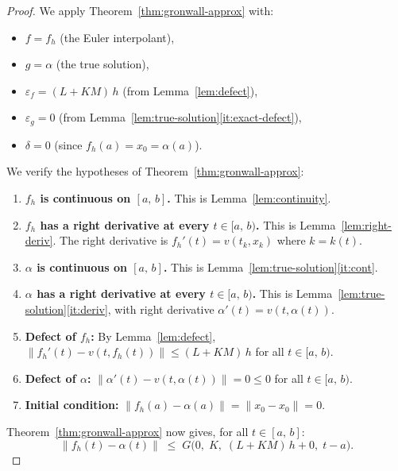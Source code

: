 \documentclass[11pt,a4paper]{article}
\theoremstyle{definition}
\newcommand{\norm}[1]{\lVert #1 \rVert}
\newcommand{\Icc}[2]{[#1,\, #2]}
\newcommand{\Ico}[2]{[#1,\, #2)}
\begin{document}
\begin{proof}
We apply Theorem~\ref{thm:gronwall-approx} with:
\begin{itemize}
  \item $f = f_h$ (the Euler interpolant),
  \item $g = \alpha$ (the true solution),
  \item $\varepsilon_f = (L + KM)\,h$ (from Lemma~\ref{lem:defect}),
  \item $\varepsilon_g = 0$ (from Lemma~\ref{lem:true-solution}\ref{it:exact-defect}),
  \item $\delta = 0$ (since $f_h(a) = x_0 = \alpha(a)$).
\end{itemize}

We verify the hypotheses of Theorem~\ref{thm:gronwall-approx}:
\begin{enumerate}[label=(\alph*)]
  \item \textbf{$f_h$ is continuous on $\Icc{a}{b}$.}
    This is Lemma~\ref{lem:continuity}.

  \item \textbf{$f_h$ has a right derivative at every $t \in \Ico{a}{b}$.}
    This is Lemma~\ref{lem:right-deriv}. The right derivative
    is $f_h'(t) = v(t_k, x_k)$ where $k = k(t)$.

  \item \textbf{$\alpha$ is continuous on $\Icc{a}{b}$.}
    This is Lemma~\ref{lem:true-solution}\ref{it:cont}.

  \item \textbf{$\alpha$ has a right derivative at every $t \in \Ico{a}{b}$.}
    This is Lemma~\ref{lem:true-solution}\ref{it:deriv}, with
    right derivative $\alpha'(t) = v(t, \alpha(t))$.

  \item \textbf{Defect of $f_h$:}
    By Lemma~\ref{lem:defect},
    $\norm{f_h'(t) - v(t, f_h(t))} \le (L + KM)\,h$ for all
    $t \in \Ico{a}{b}$.

  \item \textbf{Defect of $\alpha$:}
    $\norm{\alpha'(t) - v(t, \alpha(t))} = 0 \le 0$ for all
    $t \in \Ico{a}{b}$.

  \item \textbf{Initial condition:}
    $\norm{f_h(a) - \alpha(a)} = \norm{x_0 - x_0} = 0$.
\end{enumerate}

Theorem~\ref{thm:gronwall-approx} now gives, for all $t \in \Icc{a}{b}$:
\[
  \norm{f_h(t) - \alpha(t)}
  \;\le\; G\bigl(0,\; K,\; (L + KM)\,h + 0,\; t - a\bigr).
\]


\end{proof}
\end{document}
